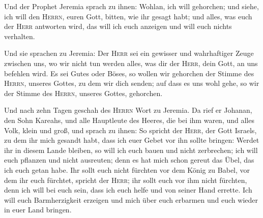  Und der Prophet Jeremia sprach zu ihnen: Wohlan, ich will
gehorchen; und siehe, ich will den \textsc{Herrn}, euren Gott, bitten,
wie ihr gesagt habt; und alles, was euch der \textsc{Herr} antworten
wird, das will ich euch anzeigen und will euch nichts verhalten.

 Und sie sprachen zu Jeremia: Der \textsc{Herr} sei ein
gewisser und wahrhaftiger Zeuge zwischen uns, wo wir nicht tun werden
alles, was dir der \textsc{Herr}, dein Gott, an uns befehlen wird.
 Es sei Gutes oder Böses, so wollen wir gehorchen der
Stimme des \textsc{Herrn}, unseres Gottes, zu dem wir dich senden; auf
dass es uns wohl gehe, so wir der Stimme des \textsc{Herrn}, unseres
Gottes, gehorchen.

 Und nach zehn Tagen geschah des \textsc{Herrn} Wort zu
Jeremia.  Da rief er Johanan, den Sohn Kareahs, und alle
Hauptleute des Heeres, die bei ihm waren, und alles Volk, klein und
groß,  und sprach zu ihnen: So spricht der \textsc{Herr},
der Gott Israels, zu dem ihr mich gesandt habt, dass ich euer Gebet vor
ihn sollte bringen:  Werdet ihr in diesem Lande bleiben,
so will ich euch bauen und nicht zerbrechen; ich will euch pflanzen und
nicht ausreuten; denn es hat mich schon gereut das Übel, das ich euch
getan habe.  Ihr sollt euch nicht fürchten vor dem König
zu Babel, vor dem ihr euch fürchtet, spricht der \textsc{Herr}; ihr
sollt euch vor ihm nicht fürchten, denn ich will bei euch sein, dass ich
euch helfe und von seiner Hand errette.  Ich will euch
Barmherzigkeit erzeigen und mich über euch erbarmen und euch wieder in
euer Land bringen.

